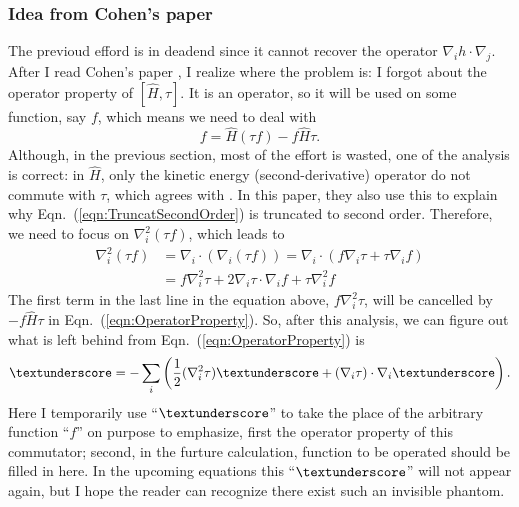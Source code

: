 \subsubsection{Idea from Cohen's paper}
The previoud efford is in deadend since it cannot recover the operator $\nabla_i h\cdot\nabla_j$. After I read Cohen's paper \cite{cohen2019SimilarityTransformation}, I realize where the problem is: I forgot about the operator property of $[\hat{H},\tau]$. It is an operator, so it will be used on some function, say $f$, which means we need to deal with 
\begin{equation}
    [\hat{H},\tau]f=\hat{H}(\tau f)-f\hat{H}\tau.
    \label{eqn:OperatorProperty}
\end{equation}
Although, in the previous section, most of the effort is wasted, one of the analysis is correct: in $\hat{H}$, only the kinetic energy (second-derivative) operator do not commute with $\tau$, which agrees with \cite{cohen2019SimilarityTransformation}. In this paper, they also use this to explain why Eqn.~(\ref{eqn:TruncatSecondOrder}) is truncated to second order. Therefore, we need to focus on $\nabla_i^2(\tau f)$, which leads to
\begin{equation}
    \begin{split}
        \nabla_i^2(\tau f)&=\nabla_i\cdot(\nabla_i(\tau f))=\nabla_i\cdot(f\nabla_i\tau+\tau\nabla_i f)\\
        &=f\nabla_i^2\tau+2\nabla_i\tau\cdot\nabla_i f+\tau\nabla_i^2f
    \end{split}    
\end{equation}
The first term in the last line in the equation above, $f\nabla_i^2\tau$, will be cancelled by $-f\hat{H}\tau$ in Eqn.~(\ref{eqn:OperatorProperty}). So, after this analysis, we can figure out what is left behind from Eqn.~(\ref{eqn:OperatorProperty}) is
\begin{equation}
    [\hat{H},\tau]\textunderscore=-\sum_i\left(\frac{1}{2}(\nabla_i^2\tau)\textunderscore+(\nabla_i\tau)\cdot\nabla_i\textunderscore\right).
\end{equation}
Here I temporarily use ``$\textunderscore$'' to take the place of the arbitrary function ``$f$'' on purpose  to emphasize, first the operator property of this commutator; second, in the furture calculation, function to be operated should be filled in here. In the upcoming equations this ``$\textunderscore$'' will not appear again, but I hope the reader can recognize there exist such an invisible phantom. 

